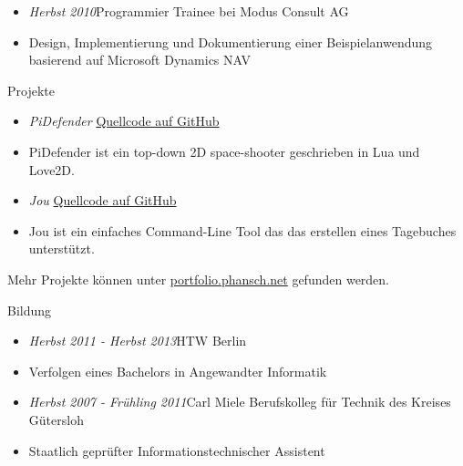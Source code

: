 \documentclass[12pt]{article}
\begin{document}
\begin{itemize}
  \setlength{\itemsep}{0cm}
  \setlength{\parskip}{0cm}

  \item[] \emph{Herbst 2010}\hfill Programmier Trainee bei Modus Consult AG
  \item[] Design, Implementierung und Dokumentierung einer Beispielanwendung basierend auf Microsoft Dynamics NAV
\end{itemize}

\vspace{0.5cm}
{\Large Projekte}

\begin{itemize}
  \setlength{\itemsep}{0cm}
  \setlength{\parskip}{0cm}
  \item[] \emph{PiDefender} \hfill \href{https://github.com/phansch/PiDefender}{Quellcode auf GitHub}

  \item[] PiDefender ist ein top-down 2D space-shooter geschrieben in Lua und Love2D.
\end{itemize}


\begin{itemize}
  \setlength{\itemsep}{0cm}
  \setlength{\parskip}{0cm}
  \item[] \emph{Jou} \hfill \href{https://github.com/phansch/jou}{Quellcode auf GitHub}

  \item[] Jou ist ein einfaches Command-Line Tool das das erstellen eines Tagebuches unterstützt.
\end{itemize}

Mehr Projekte können unter \href{http://phansch.net/portfolio/#folio-overview}{portfolio.phansch.net} gefunden werden.

\vspace{0.5cm}
{\Large Bildung}

\begin{itemize}
  \setlength{\itemsep}{0cm}
  \setlength{\parskip}{0.1cm}
  \item[] \emph{Herbst 2011 - Herbst 2013}\hfill HTW Berlin
  \item[] Verfolgen eines Bachelors in Angewandter Informatik
\end{itemize}

\begin{itemize}
  \setlength{\itemsep}{0cm}
  \setlength{\parskip}{0.1cm}
  \item[] \emph{Herbst 2007 - Frühling 2011}\hfill Carl Miele Berufskolleg für Technik des Kreises Gütersloh
  \item[] Staatlich geprüfter Informationstechnischer Assistent
\end{itemize}
\end{document}
